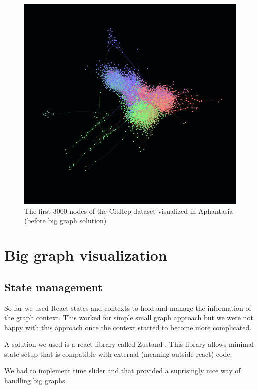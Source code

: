 \begin{figure}[p]\centering
    \includegraphics[width=140mm, keepaspectratio]{img/Afantazie_cithep_3000.png}
    \caption{The first 3000 nodes of the CitHep dataset visualized in Aphantasia (before big graph solution)}
    \label{obr:afantazie_cithep_3k}
\end{figure}

\section{Big graph visualization}

\subsection*{State management}

So far we used React states and contexts to hold and manage the information of the graph context.
This worked for simple small graph approach but we were not happy with this approach once the context started to become more complicated.

A solution we used is a react library called Zustand \cite{zustand_homepage}.
This library allows minimal state setup that is compatible with external (meaning outside react) code.

We had to implement time slider and that provided a suprisingly nice way of handling big graphs.

